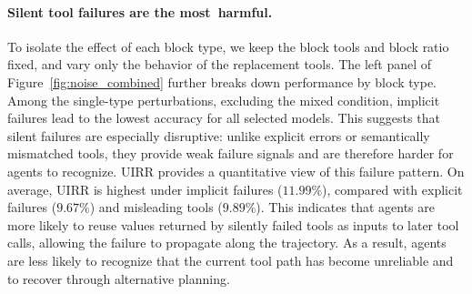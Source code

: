 \paragraph{Silent tool failures are the most~harmful.}
To isolate the effect of each block type, we keep the block tools and block ratio fixed, and vary only the behavior of the replacement tools. 
The left panel of Figure~\ref{fig:noise_combined} further breaks down performance by block type. 
Among the single-type perturbations, excluding the mixed condition, implicit failures lead to the lowest accuracy for all selected models. 
This suggests that silent failures are especially disruptive: unlike explicit errors or semantically mismatched tools, they provide weak failure signals and are therefore harder for agents to recognize.
UIRR provides a quantitative view of this failure pattern.
On average, UIRR is highest under implicit failures ($11.99\%$), compared with explicit failures ($9.67\%$) and misleading tools ($9.89\%$).
This indicates that agents are more likely to reuse values returned by silently failed tools as inputs to later tool calls, allowing the failure to propagate along the trajectory.
As a result, agents are less likely to recognize that the current tool path has become unreliable and to recover through alternative planning.



